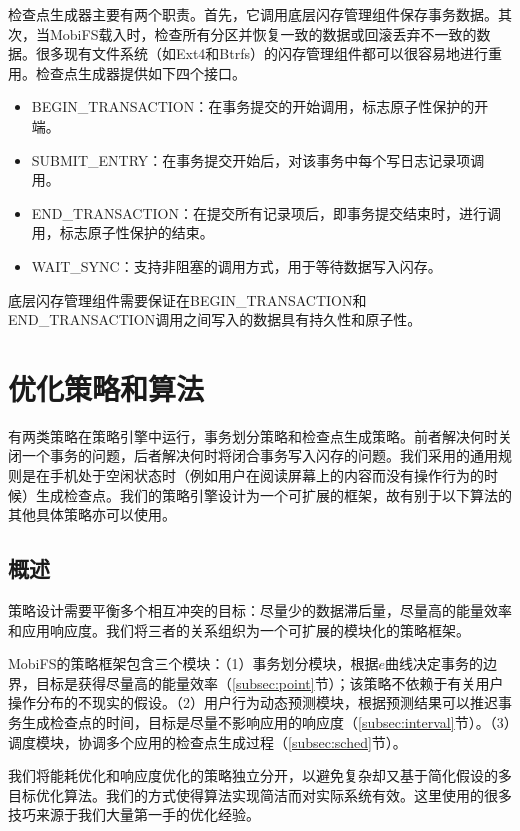 检查点生成器主要有两个职责。首先，它调用底层闪存管理组件保存事务数据。其次，当MobiFS载入时，检查所有分区并恢复一致的数据或回滚丢弃不一致的数据。很多现有文件系统（如Ext4和Btrfs）的闪存管理组件都可以很容易地进行重用。检查点生成器提供如下四个接口。 

\begin{itemize}
\item BEGIN\_TRANSACTION：在事务提交的开始调用，标志原子性保护的开端。 
\item SUBMIT\_ENTRY：在事务提交开始后，对该事务中每个写日志记录项调用。 
\item END\_TRANSACTION：在提交所有记录项后，即事务提交结束时，进行调用，标志原子性保护的结束。 
\item WAIT\_SYNC：支持非阻塞的调用方式，用于等待数据写入闪存。 
\end{itemize}

底层闪存管理组件需要保证在BEGIN\_TRANSACTION和END\_TRANSACTION调用之间写入的数据具有持久性和原子性。 

\section{优化策略和算法}

有两类策略在策略引擎中运行，事务划分策略和检查点生成策略。前者解决何时关闭一个事务的问题，后者解决何时将闭合事务写入闪存的问题。我们采用的通用规则是在手机处于空闲状态时（例如用户在阅读屏幕上的内容而没有操作行为的时候）生成检查点。我们的策略引擎设计为一个可扩展的框架，故有别于以下算法的其他具体策略亦可以使用。

\subsection{概述}

策略设计需要平衡多个相互冲突的目标：尽量少的数据滞后量，尽量高的能量效率和应用响应度。我们将三者的关系组织为一个可扩展的模块化的策略框架。 

MobiFS的策略框架包含三个模块：（1）事务划分模块，根据$e$曲线决定事务的边界，目标是获得尽量高的能量效率（\ref{subsec:point}节）；该策略不依赖于有关用户操作分布的不现实的假设。（2）用户行为动态预测模块，根据预测结果可以推迟事务生成检查点的时间，目标是尽量不影响应用的响应度（\ref{subsec:interval}节）。（3）调度模块，协调多个应用的检查点生成过程（\ref{subsec:sched}节）。 
 
我们将能耗优化和响应度优化的策略独立分开，以避免复杂却又基于简化假设的多目标优化算法。我们的方式使得算法实现简洁而对实际系统有效。这里使用的很多技巧来源于我们大量第一手的优化经验。 

